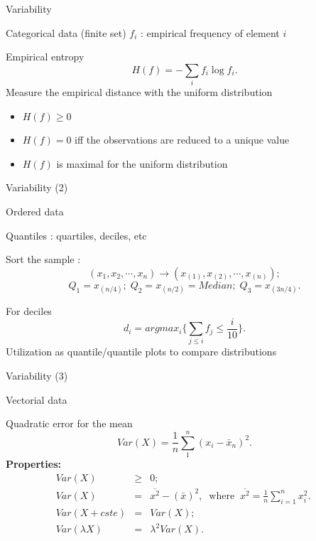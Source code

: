 \documentclass[xcolor=x11names,compress,8pt,
]{beamer}
\def\leq{\leqslant}
\def\geq{\geqslant}
\renewcommand{\(}{\begin{columns}}
\renewcommand{\)}{\end{columns}}
\newcommand{\<}[1]{\begin{column}{#1}}
\renewcommand{\>}{\end{column}}
\begin{document}
\begin{frame}{Variability}
\begin{block}{Categorical data (finite set)}
$f_i$ : empirical frequency of element $i$

Empirical entropy
\[
H(f)=-\sum_i f_i \log f_i.\]
Measure the empirical distance with the uniform distribution
\begin{itemize}
\item $H(f)\geq 0$
\item $H(f)=0$ iff the observations are reduced to a unique value
\item $H(f)$ is maximal for the uniform distribution
\end{itemize} 
\end{block}
\end{frame}
\begin{frame}{Variability (2)}
\begin{block}{Ordered data }

Quantiles : quartiles, deciles, etc

Sort the sample : 
\[
(x_1,x_2,\cdots ,x_n)\longrightarrow  (x_{(1)},x_{(2)},\cdots ,x_{(n)});\]
\[
Q_1=x_{(n/4)};\; Q_2=x_{(n/2)}=Median;\; Q_3=x_{(3n/4)}.\]

For deciles
\[
d_i = argmax_i \{\sum_{j\leq i}f_j \leq \frac i {10}\}.\]
Utilization as quantile/quantile plots to compare distributions
\end{block}
\end{frame}
\begin{frame}{Variability (3)}
\begin{block}{ Vectorial data }

Quadratic error for the mean 
\[
Var(X)=\frac 1 n \sum_1^n (x_i-\bar{x}_n)^2.\]
{\bf Properties:}
\begin{eqnarray*}
Var(X) & \geq & 0;\\
Var(X)&=&\overline{x^2}-(\bar{x})^2, \;\;\mbox{where} \;\;\overline{x^2}=\frac 1 n \sum_{i=1}^n x_i^2.\;\\
Var(X+cste)&=&Var(X);\\
Var(\lambda X)&=&\lambda^2 Var(X).
\end{eqnarray*}

\end{block}
\end{frame}
\end{document}
